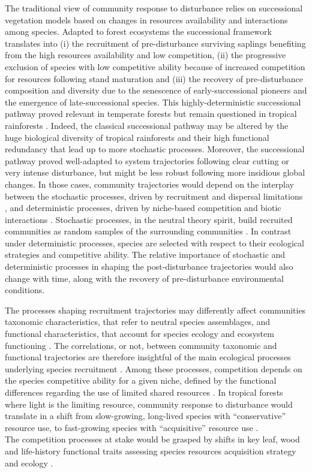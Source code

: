 \documentclass[
  11pt,
  french,
  A4paper,
  extrafontsizes,onecolumn,openright
  ]{memoir}
\begin{document}
The traditional view of community response to disturbance relies on
successional vegetation models \autocite{Clements1916} based on changes
in resources availability and interactions among species. Adapted to
forest ecosystems the successional framework translates into
\autocite{Denslow2000} (i) the recruitment of pre-disturbance surviving
saplings benefiting from the high resources availability and low
competition, (ii) the progressive exclusion of species with low
competitive ability because of increased competition for resources
following stand maturation and (iii) the recovery of pre-disturbance
composition and diversity due to the senescence of early-successional
pioneers and the emergence of late-successional species. This
highly-deterministic successional pathway proved relevant in temperate
forests but remain questioned in tropical rainforests
\autocite{Norden2015}. Indeed, the classical successional pathway may be
altered by the huge biological diversity of tropical rainforests and
their high functional redundancy that lead up to more stochastic
processes. Moreover, the successional pathway proved well-adapted to
system trajectories following clear cutting or very intense disturbance,
but might be less robust following more insidious global changes. In
those cases, community trajectories would depend on the interplay
between the stochastic processes, driven by recruitment and dispersal
limitations \autocite{Hubbell2001}, and deterministic processes, driven
by niche-based competition and biotic interactions \autocite{Adler2007}.
Stochastic processes, in the neutral theory spirit, build recruited
communities as random samples of the surrounding communities
\autocite{Chave2004}. In contrast under deterministic processes, species
are selected with respect to their ecological strategies and competitive
ability. The relative importance of stochastic and deterministic
processes in shaping the post-disturbance trajectories would also change
with time, along with the recovery of pre-disturbance environmental
conditions.

The processes shaping recruitment trajectories may differently affect
communities taxonomic characteristics, that refer to neutral species
assemblages, and functional characteristics, that account for species
ecology and ecosystem functioning \autocites{Violle2007b}{Kunstler2016}.
The correlations, or not, between community taxonomic and functional
trajectories are therefore insightful of the main ecological processes
underlying species recruitment \autocite{Fukami2005}. Among these
processes, competition depends on the species competitive ability for a
given niche, defined by the functional differences regarding the use of
limited shared resources \autocite{Perronne2017}. In tropical forests
where light is the limiting resource, community response to disturbance
would translate in a shift from slow-growing, long-lived species with
``conservative'' resource use, to fast-growing species with
``acquisitive'' resource use
\autocites{Denslow1980}{Molino2001}{Bongers2009}.\\
The competition processes at stake would be grasped by shifts in key
leaf, wood and life-history functional traits assessing species
resources acquisition strategy and ecology
\autocites{Wright2004}{Chave2009}{Herault2011}.
\end{document}
